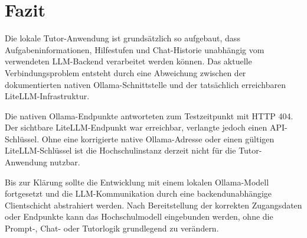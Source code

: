 \documentclass[11pt,a4paper,oneside,ngerman]{memoir}
\begin{document}
\chapter{Fazit}

Die lokale Tutor-Anwendung ist grundsätzlich so aufgebaut, dass Aufgabeninformationen, Hilfestufen und Chat-Historie unabhängig vom verwendeten LLM-Backend verarbeitet werden können. Das aktuelle Verbindungsproblem entsteht durch eine Abweichung zwischen der dokumentierten nativen Ollama-Schnittstelle und der tatsächlich erreichbaren LiteLLM-Infrastruktur.

Die nativen Ollama-Endpunkte antworteten zum Testzeitpunkt mit HTTP 404. Der sichtbare LiteLLM-Endpunkt war erreichbar, verlangte jedoch einen API-Schlüssel. Ohne eine korrigierte native Ollama-Adresse oder einen gültigen LiteLLM-Schlüssel ist die Hochschulinstanz derzeit nicht für die Tutor-Anwendung nutzbar.

Bis zur Klärung sollte die Entwicklung mit einem lokalen Ollama-Modell fortgesetzt und die LLM-Kommunikation durch eine backendunabhängige Clientschicht abstrahiert werden. Nach Bereitstellung der korrekten Zugangsdaten oder Endpunkte kann das Hochschulmodell eingebunden werden, ohne die Prompt-, Chat- oder Tutorlogik grundlegend zu verändern.
\end{document}
